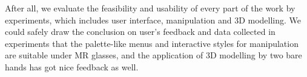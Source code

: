 \begin{englishabstract}
After all, we evaluate the feasibility and usability of every part of the work by experiments, which includes user interface, manipulation and 3D modelling.
We could safely draw the conclusion on user's feedback and data collected in experiments that the palette-like menus and interactive styles for manipulation are suitable under MR glasses, and the application of 3D modelling by two bare hands has got nice feedback as well.

\end{englishabstract}
